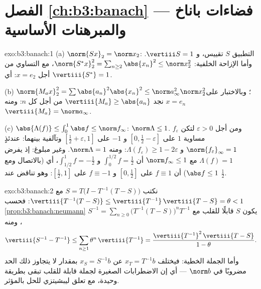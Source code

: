 \section*{الفصل \ref{ch:b3:banach} --- فضاءات باناخ والمبرهنات
الأساسية}

\begin{solution}{exo:b3:banach:1}
(a) $\norm{Sx}_2 = \norm x_2$: التطبيق $S$ تقييس، و $\vertiii S =
1$. وأما الإزاحة الخلفية:
$\norm{S^*x}_2^2 = \sum_{n \geq
2}\abs{x_n}^2 \leq \norm x_2^2$، مع التساوي من أجل $x = e_2$: أي $\vertiii{S^*} = 1$.

(b) $\norm{M_ax}_2^2 = \sum\abs{a_n}^2\abs{x_n}^2 \leq \norm
a_\infty^2\norm x_2^2$؛ وبالاختبار على $x = e_n$ نجد $\vertiii{M_a}
\geq \abs{a_n}$ من أجل كل $n$:
ومنه $\vertiii{M_a} = \norm a_\infty$.

(c) $\abs{\Lambda(f)} \leq \int_0^1\abs f \leq \norm f_\infty$: $\norm\Lambda \leq 1$. ومن أجل $\varepsilon > 0$ لتكن $f_\varepsilon$ مساوية
$1$ على $[0, \frac12 - \varepsilon]$ و $-1$ على $[\frac12 +
\varepsilon, 1]$ وتآلفية بينهما: عندئذٍ $\norm{f_\varepsilon}_\infty =
1$
و $\Lambda(f_\varepsilon) \geq 1 - 2\varepsilon$: ومنه $\norm\Lambda = 1$. وغير مبلوغ: إذ يفرض $\Lambda(f) = 1$ مع
$\norm
f_\infty \leq 1$ أن $\int_0^{1/2}f = \frac12$ و $\int_{1/2}^1 f = -\frac12$، أي (بالاتصال ومع $\abs f \leq 1$) أن
$f \equiv 1$ على $[0, \frac12]$ و $f \equiv -1$ على $[\frac12,
1]$: وهو
تناقض عند $\frac12$.
\end{solution}

\begin{solution}{exo:b3:banach:2}
نكتب $S = T\bigl(I - T^{-1}(T - S)\bigr)$ مع $\vertiii{T^{-1}(T-S)} \leq \vertiii{T^{-1}}\,\vertiii{T - S} =
\theta < 1$: فحسب \cref{prop:b3:banach:neumann} يكون $S$ قابلًا للقلب
مع $S^{-1} = \sum_{n\geq0}\bigl(T^{-1}(T -
S)\bigr)^nT^{-1}$، ومنه
\[
\vertiii{S^{-1} - T^{-1}} \leq
\sum_{n\geq1}\theta^n\,\vertiii{T^{-1}}
= \frac{\vertiii{T^{-1}}^2\,\vertiii{T - S}}{1 - \theta}.
\]
وأما الجملة الخطية: فيختلف $x_T = T^{-1}b$ عن $x_S = S^{-1}b$
بمقدار لا يتجاوز ذلك الحد مضروبًا في $\norm b$ --- أي إن
الاضطرابات الصغيرة لجملة قابلة للقلب تبقى  بطريقة
وحيدة، مع تعلق ليبشيتزي للحل بالمؤثر.
\end{solution}

